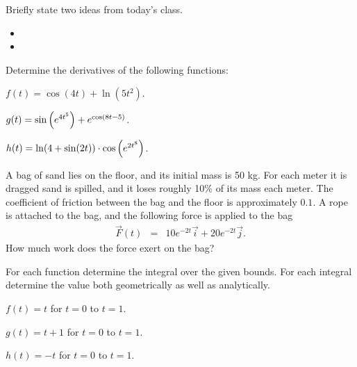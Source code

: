 \begin{problem}
\item Briefly state two ideas from today's class.
  \begin{itemize}
  \item
  \item
  \end{itemize}
\item Determine the derivatives of the following functions:
  \begin{subproblem}
  \item $f(t) = \cos(4t) + \ln(5t^2)$.
    \vfill
  \item $g(t) = \sin\left( e^{4t^5} \right)  + e^{\cos\left( 8t-5 \right)}$.
    \vfill
  \item $h(t) = \ln(4+\sin(2t) ) \cdot \cos \left( e^{2t^8} \right)$.
    \vfill
  \end{subproblem}

  \clearpage

\item A bag of sand lies on the floor, and its initial mass is 50
  kg. For each meter it is dragged sand is spilled, and it loses
  roughly 10\% of its mass each meter. The coefficient of friction
  between the bag and the floor is approximately $0.1$. A rope is
  attached to the bag, and the following force is applied to the bag
  \begin{eqnarray*}
    \vec{F}(t) & = & 10e^{-2t} \vec{i} + 20 e^{-2t} \vec{j}.
  \end{eqnarray*}
  How much work does the force exert on the bag?

  \vfill


\end{problem}


\begin{problem}
\item For each function determine the integral over the given bounds.
  For each integral determine the value both geometrically as well as
  analytically. 
  \begin{subproblem}
  \item $f(t)=t$ for $t=0$ to $t=1$.
    \vfill
  \item $g(t)=t+1$ for $t=0$ to $t=1$.
    \vfill
  \item $h(t)=-t$ for $t=0$ to $t=1$.
    \vfill
  \end{subproblem}
\end{problem}



